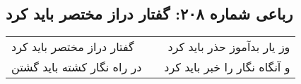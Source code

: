 \begin{center}
\section*{رباعی شماره ۲۰۸: گفتار دراز مختصر باید کرد}
\label{sec:sh208}
\begin{longtable}{l p{0.5cm} r}
گفتار دراز مختصر باید کرد
&&
وز یار بدآموز حذر باید کرد
\\
در راه نگار کشته باید گشتن
&&
و آنگاه نگار را خبر باید کرد
\\
\end{longtable}
\end{center}
